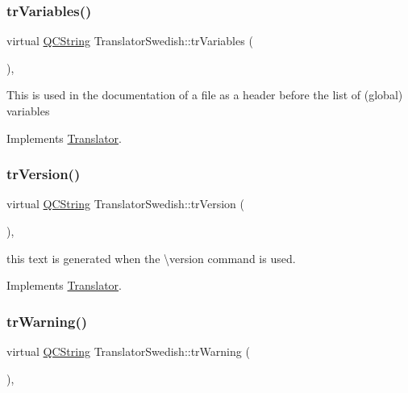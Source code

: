 \mbox{\label{class_translator_swedish_aa387d5c89e380291cf300b9dc2012534}} 
\subsubsection{\texorpdfstring{trVariables()}{trVariables()}}
{\footnotesize\ttfamily virtual \mbox{\hyperlink{class_q_c_string}{Q\+C\+String}} Translator\+Swedish\+::tr\+Variables (\begin{DoxyParamCaption}{ }\end{DoxyParamCaption})\hspace{0.3cm}{\ttfamily [inline]}, {\ttfamily [virtual]}}

This is used in the documentation of a file as a header before the list of (global) variables 

Implements \mbox{\hyperlink{class_translator}{Translator}}.

\mbox{\label{class_translator_swedish_a104841ffa19eac540a8d0371013ebdd0}} 
\subsubsection{\texorpdfstring{trVersion()}{trVersion()}}
{\footnotesize\ttfamily virtual \mbox{\hyperlink{class_q_c_string}{Q\+C\+String}} Translator\+Swedish\+::tr\+Version (\begin{DoxyParamCaption}{ }\end{DoxyParamCaption})\hspace{0.3cm}{\ttfamily [inline]}, {\ttfamily [virtual]}}

this text is generated when the \textbackslash{}version command is used. 

Implements \mbox{\hyperlink{class_translator}{Translator}}.

\mbox{\label{class_translator_swedish_ab3a7c0acd97949464cc3423dce3a6d01}} 
\subsubsection{\texorpdfstring{trWarning()}{trWarning()}}
{\footnotesize\ttfamily virtual \mbox{\hyperlink{class_q_c_string}{Q\+C\+String}} Translator\+Swedish\+::tr\+Warning (\begin{DoxyParamCaption}{ }\end{DoxyParamCaption})\hspace{0.3cm}{\ttfamily [inline]}, {\ttfamily [virtual]}}

